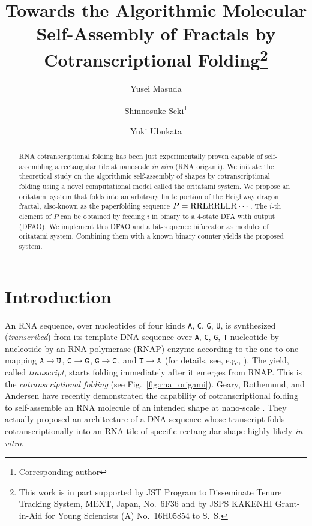 \documentclass[runningheads]{llncs}
\title{Towards the Algorithmic Molecular Self-Assembly of Fractals by Cotranscriptional Folding\thanks{This work is in part supported by JST Program to Disseminate Tenure Tracking System, MEXT, Japan, No.~6F36 and by JSPS KAKENHI Grant-in-Aid for Young Scientists (A) No.~16H05854 to S.~S.}}
\author{
Yusei Masuda \and 
Shinnosuke Seki\thanks{Corresponding author} \and 
Yuki Ubukata
}
\institute{
Department of Computer and Network Engineering, 
The University of Electro-Communications, 
1-5-1, Chofugaoka, Chofu, Tokyo, 1828585, Japan 
\email{s.seki@uec.ac.jp}
}
\begin{document}
\maketitle

\begin{abstract}
RNA cotranscriptional folding has been just experimentally proven capable of self-assembling a rectangular tile at nanoscale {\it in vivo} (RNA origami). 
We initiate the theoretical study on the algorithmic self-assembly of shapes by cotranscriptional folding using a novel computational model called the oritatami system. 
We propose an oritatami system that folds into an arbitrary finite portion of the Heighway dragon fractal, also-known as the paperfolding sequence $P = {\rm RRLRRLLR} \cdots$. 
The $i$-th element of $P$ can be obtained by feeding $i$ in binary to a 4-state DFA with output (DFAO). 
We implement this DFAO and a bit-sequence bifurcator as modules of oritatami system. 
Combining them with a known binary counter yields the proposed system. 
\end{abstract}

	\section{Introduction}

An RNA sequence, over nucleotides of four kinds {\tt A}, {\tt C}, {\tt G}, {\tt U}, is synthesized (\textit{transcribed}) from its template DNA sequence over {\tt A}, {\tt C}, {\tt G}, {\tt T} nucleotide by nucleotide by an RNA polymerase (RNAP) enzyme according to the one-to-one mapping ${\tt A} \to {\tt U}$, ${\tt C} \to {\tt G}$, ${\tt G} \to {\tt C}$, and ${\tt T} \to {\tt A}$ (for details, see, e.g., \cite{AJLMRRW2014}). 
The yield, called \textit{transcript}, starts folding immediately after it emerges from RNAP. 
This is the \textit{cotranscriptional folding} (see Fig.~\ref{fig:rna_origami}). 
Geary, Rothemund, and Andersen have recently demonstrated the capability of cotranscriptional folding to self-assemble an RNA molecule of an intended shape at nano-scale \cite{GearyRothemundAndersen2014}. 
They actually proposed an architecture of a DNA sequence whose transcript folds cotranscriptionally into an RNA tile of specific rectangular shape highly likely \textit{in vitro}. 
\end{document}
